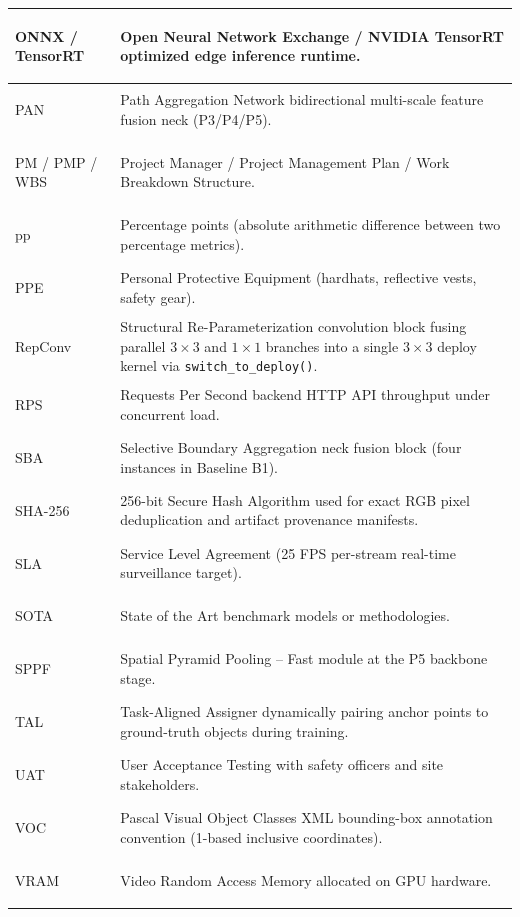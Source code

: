 \begin{longtable}{|>{\bfseries\raggedright\arraybackslash}p{3.8cm}|p{10.5cm}|}
ONNX / TensorRT & Open Neural Network Exchange / NVIDIA TensorRT optimized edge inference runtime. \\ \hline
PAN & Path Aggregation Network bidirectional multi-scale feature fusion neck (P3/P4/P5). \\ \hline
PM / PMP / WBS & Project Manager / Project Management Plan / Work Breakdown Structure. \\ \hline
pp & Percentage points (absolute arithmetic difference between two percentage metrics). \\ \hline
PPE & Personal Protective Equipment (hardhats, reflective vests, safety gear). \\ \hline
RepConv & Structural Re-Parameterization convolution block fusing parallel $3\times 3$ and $1\times 1$ branches into a single $3\times 3$ deploy kernel via \nolinkurl{switch_to_deploy()}. \\ \hline
RPS & Requests Per Second backend HTTP API throughput under concurrent load. \\ \hline
SBA & Selective Boundary Aggregation neck fusion block (four instances in Baseline B1). \\ \hline
SHA-256 & 256-bit Secure Hash Algorithm used for exact RGB pixel deduplication and artifact provenance manifests. \\ \hline
SLA & Service Level Agreement (25 FPS per-stream real-time surveillance target). \\ \hline
SOTA & State of the Art benchmark models or methodologies. \\ \hline
SPPF & Spatial Pyramid Pooling -- Fast module at the P5 backbone stage. \\ \hline
TAL & Task-Aligned Assigner dynamically pairing anchor points to ground-truth objects during training. \\ \hline
UAT & User Acceptance Testing with safety officers and site stakeholders. \\ \hline
VOC & Pascal Visual Object Classes XML bounding-box annotation convention (1-based inclusive coordinates). \\ \hline
VRAM & Video Random Access Memory allocated on GPU hardware. \\ \hline
\end{longtable}

\clearpage
{}
\listoftables

